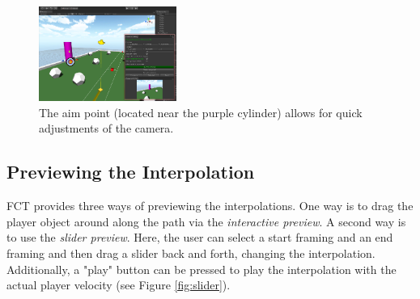 \begin{figure}[htbp]
\centering
\includegraphics[width=0.4\textwidth]{Pics/aimPoint}
\caption{The aim point (located near the purple cylinder) allows for quick adjustments of the camera.}
\label{fig:aimPoint}
\end{figure}


\subsection{Previewing the Interpolation}
FCT provides three ways of previewing the interpolations. One way is to drag the player object around along the path via the \textit{interactive preview}. A second way is to use the \textit{slider preview}. Here, the user can select a start framing and an end framing and then drag a slider back and forth, changing the interpolation. Additionally, a "play" button can be pressed to play the interpolation with the actual player velocity (see Figure \ref{fig:slider}).



